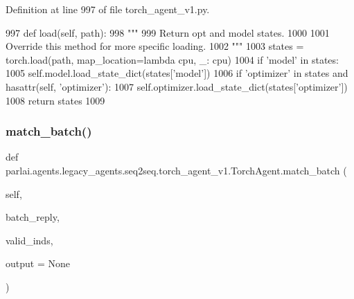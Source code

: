 Definition at line 997 of file torch\+\_\+agent\+\_\+v1.\+py.


\begin{DoxyCode}
997     \textcolor{keyword}{def }load(self, path):
998         \textcolor{stringliteral}{"""}
999 \textcolor{stringliteral}{        Return opt and model states.}
1000 \textcolor{stringliteral}{}
1001 \textcolor{stringliteral}{        Override this method for more specific loading.}
1002 \textcolor{stringliteral}{        """}
1003         states = torch.load(path, map\_location=\textcolor{keyword}{lambda} cpu, \_: cpu)
1004         \textcolor{keywordflow}{if} \textcolor{stringliteral}{'model'} \textcolor{keywordflow}{in} states:
1005             self.model.load\_state\_dict(states[\textcolor{stringliteral}{'model'}])
1006         \textcolor{keywordflow}{if} \textcolor{stringliteral}{'optimizer'} \textcolor{keywordflow}{in} states \textcolor{keywordflow}{and} hasattr(self, \textcolor{stringliteral}{'optimizer'}):
1007             self.optimizer.load\_state\_dict(states[\textcolor{stringliteral}{'optimizer'}])
1008         \textcolor{keywordflow}{return} states
1009 
\end{DoxyCode}
\mbox{\label{classparlai_1_1agents_1_1legacy__agents_1_1seq2seq_1_1torch__agent__v1_1_1TorchAgent_acac419cfad0fc5988e7e796c244f3a9f}} 
\subsubsection{\texorpdfstring{match\+\_\+batch()}{match\_batch()}}
{\footnotesize\ttfamily def parlai.\+agents.\+legacy\+\_\+agents.\+seq2seq.\+torch\+\_\+agent\+\_\+v1.\+Torch\+Agent.\+match\+\_\+batch (\begin{DoxyParamCaption}\item[{}]{self,  }\item[{}]{batch\+\_\+reply,  }\item[{}]{valid\+\_\+inds,  }\item[{}]{output = {\ttfamily None} }\end{DoxyParamCaption})}

